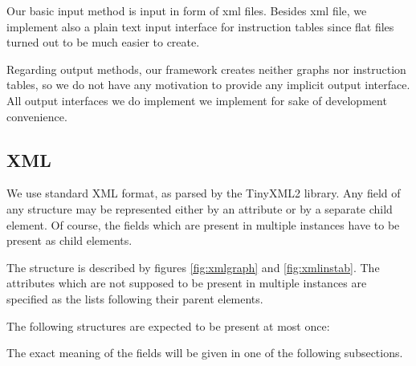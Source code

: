 \label{sec:formats}

Our basic input method is input in form of xml files. Besides xml file, we implement also a plain text input interface for instruction tables since flat files turned out to be much easier to create. 

Regarding output methods, our framework creates neither graphs nor instruction tables, so we do not have any motivation to provide any implicit output interface. All output interfaces we do implement we implement for sake of development convenience.

\subsection{XML}

We use standard XML format, as parsed by the TinyXML2 library. Any field of any structure may be represented either by an attribute or by a separate child element. Of course, the fields which are present in multiple instances have to be present as child elements.

The structure is described by figures \ref{fig:xmlgraph} and \ref{fig:xmlinstab}. The attributes which are not supposed to be present in multiple instances are specified as the lists following their parent elements.

\mybeginfig
{}

\mybeginfig
{}

The following structures are expected to be present at most once: \\ \centerline{}

The exact meaning of the fields will be given in one of the following subsections.

